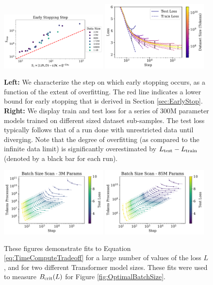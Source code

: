 \documentclass[english]{article}
\begin{document}
 \begin{figure}
\noindent \centering{} 
\includegraphics[width=0.48\textwidth]{EarlyStoppingvsNandD}\hfill
\includegraphics[width=0.48\textwidth]{TrainVsTestMedium}
\caption[Early stopping lower bound and training curves for overfit models]{ {\bf Left:}  We characterize the step on which early stopping occurs, as a function of the extent of overfitting.  The red line indicates a {lower bound} for early stopping that is derived in Section \ref{sec:EarlyStop}.  {\bf Right:} We display train and test loss for a series of 300M parameter models trained on different sized dataset sub-samples.  The test loss typically follows that of a run done with unrestricted data until diverging. Note that the degree of overfitting (as compared to the infinite data limit) is significantly overestimated by $L_{\rm test} - L_{\rm train}$ (denoted by a black bar for each run). \label{fig:OverfittingandEarlyStopping}}
\end{figure}

\begin{figure}
\noindent \centering{} 
\includegraphics[width=0.48\textwidth]{BatchParetoFronts3M} 
\includegraphics[width=0.48\textwidth]{BatchParetoFronts85M}
 \caption[Batch size scans]{These figures demonstrate fits to Equation \eqref{eq:TimeComputeTradeoff} for a large number of values of the loss $L$, and for two different Transformer model sizes.  These fits were used to measure $B_{\rm crit}(L)$ for Figure \ref{fig:OptimalBatchSize}.  \label{fig:BatchPareto}}
\end{figure}
\end{document}
